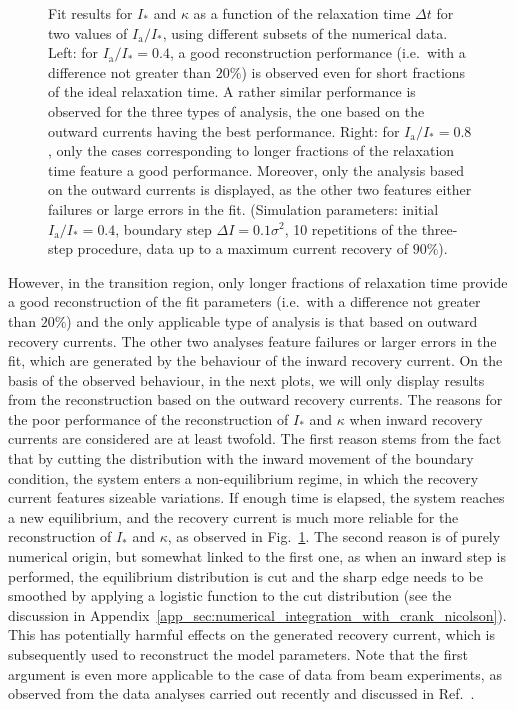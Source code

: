 {\begin{figure}[htp]
    \caption{Fit results for $I_\ast$ and $\kappa$ as a function of the relaxation time $\Delta t$ for two values of $I_\mathrm{a}/I_\ast$, using different subsets of the numerical data. Left: for $I_\mathrm{a}/I_\ast=0.4$, a good reconstruction performance  {(i.e.\ with a difference not greater than $20\%$)} is observed even for short fractions of the ideal relaxation time. A rather similar performance is observed for the three types of analysis, the one based on the outward currents having the best performance. Right: for $I_\mathrm{a} / I_\ast=0.8$, only the cases corresponding to longer fractions of the relaxation time feature a good performance. Moreover, only the analysis based on the outward currents is displayed, as the other two features either failures or large errors in the fit. (Simulation parameters: initial $I_\mathrm{a}/I_\ast=0.4$, boundary step $\Delta I =0.1 \sigma^2$, 10 repetitions of the three-step procedure, data up to a maximum current recovery of $90\%$).}
    \label{fig:all_different_time}
\end{figure}
%

However, in the transition region, only longer fractions of relaxation time provide a good reconstruction of the fit parameters  {(i.e.\ with a difference not greater than $20\%$)} and the only applicable type of analysis is that based on outward recovery currents. The other two analyses feature failures or larger errors in the fit, {which are generated by the behaviour of the inward recovery current}. On the basis of the observed behaviour, in the next plots, we will only display results from the reconstruction based on the outward recovery currents. {The reasons for the poor performance of the reconstruction of $I_\ast$ and $\kappa$ when inward recovery currents are considered are at least twofold. The first reason stems from the fact that by cutting the distribution with the inward movement of the boundary condition, the system enters a non-equilibrium regime, in which the recovery current features sizeable variations. If enough time is elapsed, the system reaches a new equilibrium, and the recovery current is much more reliable for the reconstruction of $I_\ast$ and $\kappa$, as observed in Fig.~\ref{fig:all_different_time}. The second reason is of purely numerical origin, but somewhat linked to the first one, as when an inward step is performed, the equilibrium distribution is cut and the sharp edge needs to be smoothed by applying a logistic function to the cut distribution (see the discussion in Appendix~\ref{app_sec:numerical_integration_with_crank_nicolson}). This has potentially harmful effects on the generated recovery current, which is subsequently used to reconstruct the model parameters. Note that the first argument is even more applicable to the case of data from beam experiments, as observed from the data analyses carried out recently and discussed in Ref.~\cite{montanari:ipac22-mopost043}.}

}
